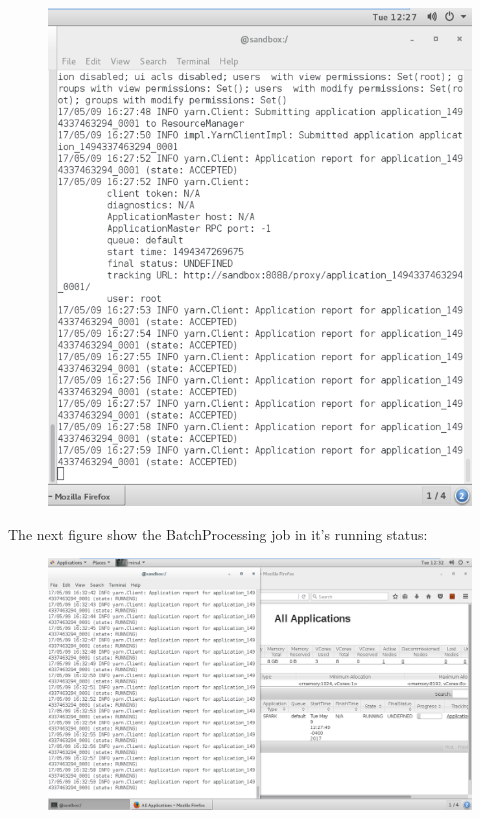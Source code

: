 \begin{figure}[h!]
	\centering
	\includegraphics[height=0.6\textheight]{fig01/SparkJobAccepted}
	\label{fig:FilialesEtClients}
\end{figure}
\newpage
The next figure show the BatchProcessing job in it's running status:
\begin{figure}[h!]
	\centering
	\includegraphics[height=0.5\textheight]{fig01/SparkJobRunning}
	\label{fig:FilialesEtClients}
\end{figure}
